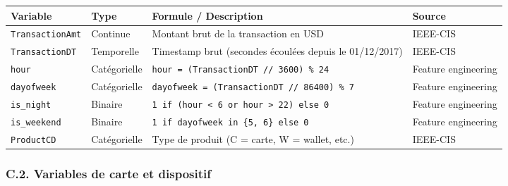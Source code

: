 \documentclass[
  12pt,
]{article}
\newcounter{none} %
\begin{document}
{\def\LTcaptype{none} %
\begin{longtable}[]{@{}
  >{\raggedright\arraybackslash}p{}
  >{\raggedright\arraybackslash}p{}
  >{\raggedright\arraybackslash}p{}
  >{\raggedright\arraybackslash}p{}@{}}
\toprule\noalign{}
\begin{minipage}[b]{\linewidth}\raggedright
Variable
\end{minipage} & \begin{minipage}[b]{\linewidth}\raggedright
Type
\end{minipage} & \begin{minipage}[b]{\linewidth}\raggedright
Formule / Description
\end{minipage} & \begin{minipage}[b]{\linewidth}\raggedright
Source
\end{minipage} \\
\midrule\noalign{}
\endhead
\bottomrule\noalign{}
\endlastfoot
\texttt{TransactionAmt} & Continue & Montant brut de la transaction en
USD & IEEE-CIS \\
\texttt{TransactionDT} & Temporelle & Timestamp brut (secondes écoulées
depuis le 01/12/2017) & IEEE-CIS \\
\texttt{hour} & Catégorielle &
\texttt{hour\ =\ (TransactionDT\ //\ 3600)\ \%\ 24} & Feature
engineering \\
\texttt{dayofweek} & Catégorielle &
\texttt{dayofweek\ =\ (TransactionDT\ //\ 86400)\ \%\ 7} & Feature
engineering \\
\texttt{is\_night} & Binaire &
\texttt{1\ if\ (hour\ \textless{}\ 6\ or\ hour\ \textgreater{}\ 22)\ else\ 0}
& Feature engineering \\
\texttt{is\_weekend} & Binaire &
\texttt{1\ if\ dayofweek\ in\ \{5,\ 6\}\ else\ 0} & Feature
engineering \\
\texttt{ProductCD} & Catégorielle & Type de produit (C = carte, W =
wallet, etc.) & IEEE-CIS \\
\end{longtable}
}

\subsubsection{C.2. Variables de carte et
dispositif}\label{c.2.-variables-de-carte-et-dispositif}
\end{document}
